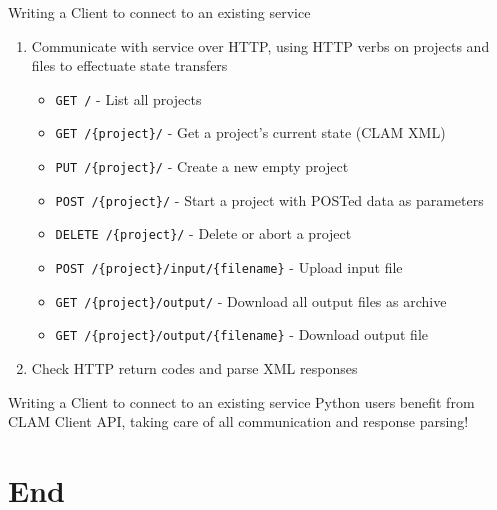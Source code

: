 \documentclass[compress]{beamer}
\begin{document}
\begin{frame}
    \begin{block}{Writing a Client to connect to an existing service}
        \begin{enumerate}
            \item Communicate with service over HTTP, using HTTP verbs on projects and files to effectuate state transfers 
            {\footnotesize
            \begin{itemize}
                \item \texttt{GET /} - List all projects
                \item \texttt{GET /\{project\}/} - Get a project's current state (CLAM XML)
                \item \texttt{PUT /\{project\}/} - Create a new empty project
                \item \texttt{POST /\{project\}/} - Start a project with POSTed data as parameters
                \item \texttt{DELETE /\{project\}/} - Delete or abort a project
                \item \texttt{POST /\{project\}/input/\{filename\}} - Upload input file
                \item \texttt{GET /\{project\}/output/} - Download all output files as archive
                \item \texttt{GET /\{project\}/output/\{filename\}} - Download output file
            \end{itemize}
            }
            \item Check HTTP return codes and parse XML responses
        \end{enumerate}
    \end{block}

\end{frame}


\begin{frame}
    \begin{block}{Writing a Client to connect to an existing service}
        Python users benefit from CLAM Client API, taking care of all communication and response parsing!
    \end{block}

\end{frame}

\section{End}


\begin{frame}
    \raccoon
\end{frame}
\end{document}
